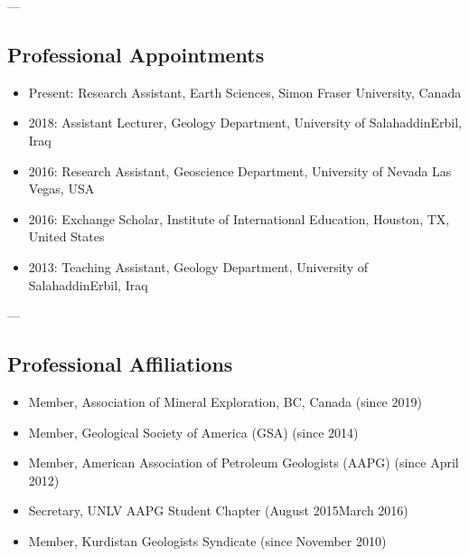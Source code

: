 \documentclass[letterpaper,10pt,english]{sphinxmanual}
\begin{document}
\sphinxAtStartPar
—


\subsection{Professional Appointments}
\label{\detokenize{CV_Mahmud_2023:professional-appointments}}\begin{itemize}
\item {} 
\sphinxhyphen{}Present: Research Assistant, Earth Sciences, Simon Fraser University, Canada

\item {} 
\sphinxhyphen{}2018: Assistant Lecturer, Geology Department, University of Salahaddin\sphinxhyphen{}Erbil, Iraq

\item {} 
\sphinxhyphen{}2016: Research Assistant, Geoscience Department, University of Nevada Las Vegas, USA

\item {} 
\sphinxhyphen{}2016: Exchange Scholar, Institute of International Education, Houston, TX, United States

\item {} 
\sphinxhyphen{}2013: Teaching Assistant, Geology Department, University of Salahaddin\sphinxhyphen{}Erbil, Iraq

\end{itemize}

\sphinxAtStartPar
—


\subsection{Professional Affiliations}
\label{\detokenize{CV_Mahmud_2023:professional-affiliations}}\begin{itemize}
\item {} 
\sphinxAtStartPar
Member, Association of Mineral Exploration, BC, Canada (since 2019)

\item {} 
\sphinxAtStartPar
Member, Geological Society of America (GSA) (since 2014)

\item {} 
\sphinxAtStartPar
Member, American Association of Petroleum Geologists (AAPG) (since April 2012)

\item {} 
\sphinxAtStartPar
Secretary, UNLV AAPG Student Chapter (August 2015\sphinxhyphen{}March 2016)

\item {} 
\sphinxAtStartPar
Member, Kurdistan Geologists Syndicate (since November 2010)

\end{itemize}
\end{document}
